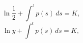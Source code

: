 \documentclass{article}
\begin{document}
$$\ln\frac{1}{2}+\int^t p(s)\,ds=K,$$
$$\ln y+\int^t p(s)\,ds=K,$$
\end{document}
